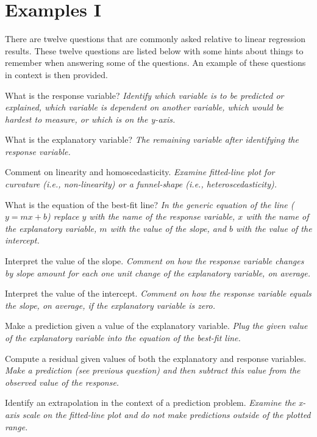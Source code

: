 \documentclass[10pt,openany]{book}\usepackage[]{graphicx}\usepackage[]{color}
\begin{document}


\section{Examples I}
There are twelve questions that are commonly asked relative to linear regression results.  These twelve questions are listed below with some hints about things to remember when answering some of the questions.  An example of these questions in context is then provided.

\begin{Enumerate}
  \item What is the response variable?  \textit{Identify which variable is to be predicted or explained, which variable is dependent on another variable, which would be hardest to measure, or which is on the y-axis.}
  \item What is the explanatory variable?  \textit{The remaining variable after identifying the response variable.}
  \item Comment on linearity and homoscedasticity.  \textit{Examine fitted-line plot for curvature (i.e., non-linearity) or a funnel-shape (i.e., heteroscedasticity).}
  \item What is the equation of the best-fit line?  \textit{In the generic equation of the line ($y=mx+b$) replace $y$ with the name of the response variable, $x$ with the name of the explanatory variable, $m$ with the value of the slope, and $b$ with the value of the intercept.}
  \item Interpret the value of the slope.  \textit{Comment on how the response variable changes by slope amount for each one unit change of the explanatory variable, on average.}
  \item Interpret the value of the intercept.  \textit{Comment on how the response variable equals the slope, on average, if the explanatory variable is zero.}
  \item Make a prediction given a value of the explanatory variable.  \textit{Plug the given value of the explanatory variable into the equation of the best-fit line.}
  \item Compute a residual given values of both the explanatory and response variables.  \textit{Make a prediction (see previous question) and then subtract this value from the observed value of the response.}
  \item Identify an extrapolation in the context of a prediction problem.  \textit{Examine the x-axis scale on the fitted-line plot and do not make predictions outside of the plotted range.}

\end{Enumerate}
\end{document}
